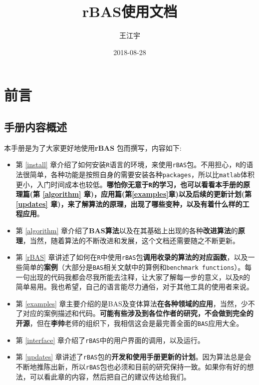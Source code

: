 \documentclass[]{ctexbook}
\title{rBAS使用文档}
\author{王江宇}
\date{2018-08-28}
\theoremstyle{definition}
\theoremstyle{definition}
\theoremstyle{definition}
\theoremstyle{remark}
\begin{document}
\maketitle

{
\setcounter{tocdepth}{2}
\tableofcontents
}
\listoftables
\listoffigures
\mainmatter

\chapter*{前言}


\section*{手册内容概述}


本手册是为了大家更好地使用\textbf{rBAS}
\citep{R-rBAS}包而撰写，内容如下:

\begin{itemize}
\item
  第 \ref{install}
  章介绍了如何安装\texttt{R}语言的环境，来使用\texttt{rBAS}包。不用担心，\texttt{R}的语法很简单，各种功能是按照自身的需要安装各种\texttt{packages}，所以比\texttt{matlab}体积更小，入门时间成本也较低。\textbf{哪怕你无意于\texttt{R}的学习，也可以看看本手册的原理篇(第
  \ref{algorithm} 章)，应用篇(第\ref{examples}章)以及后续的更新计划(第
  \ref{updates}
  章)，来了解算法的原理，出现了哪些变种，以及有着什么样的工程应用}。
\item
  第 \ref{algorithm}
  章介绍了\textbf{BAS算法}以及在其基础上出现的各种\textbf{改进算法}的\textbf{原理}，当然，随着算法的不断改进和发展，这个文档还需要随之不断更新。
\item
  第 \ref{rBAS}
  章讲述了如何在\texttt{R}中使用\texttt{rBAS}包\textbf{调用收录的算法的对应函数}，以及一些简单的\textbf{案例}（大部分是\texttt{BAS}相关文献中的算例和\texttt{benchmark\ functions}）。每一句出现的代码我都会尽我所能去注释，让大家了解每一步的意义，以及\texttt{R}的简单易用。我也希望，自己的语言能尽力通俗，对于其他工具的使用者来说。
\item
  第 \ref{examples}
  章主要介绍的是BAS及变体算法\textbf{在各种领域的应用}，当然，少不了对应的案例描述和代码。\textbf{可能有些涉及到各位作者的研究，不会做到完全的开源}，但在\textbf{李帅}老师的组织下，我相信这会是最完善全面的\texttt{BAS}应用大全。
\item
  第 \ref{interface} 章介绍了\texttt{rBAS}中的用户界面的调用，以及运行。
\item
  第 \ref{updates}
  章讲述了\texttt{rBAS}包的\textbf{开发和使用手册更新的计划}。因为算法总是会不断地推陈出新，所以\texttt{rBAS}包也必须和目前的研究保持一致。如果你有好的想法，可以看此章的内容，然后把自己的建议传达给我们。
\end{itemize}
\end{document}

